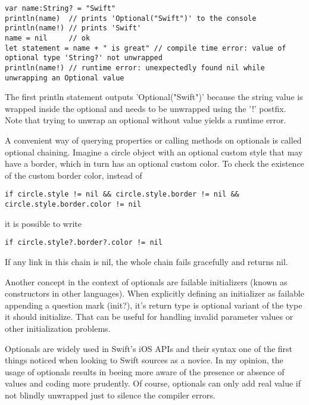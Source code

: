 \begin{lstlisting}[frame=none]
var name:String? = "Swift"
println(name)  // prints 'Optional("Swift")' to the console
println(name!) // prints 'Swift'
name = nil     // ok
let statement = name + " is great" // compile time error: value of optional type 'String?' not unwrapped
println(name!) // runtime error: unexpectedly found nil while unwrapping an Optional value
\end{lstlisting}

The first println statement outputs 'Optional("Swift")' because the string value is wrapped inside the optional and needs to be unwrapped using the '!' postfix. Note that trying to unwrap an optional without value yields a runtime error.

A convenient way of querying properties or calling methods on optionals is called optional chaining. Imagine a circle object with an optional custom style that may have a border, which in turn has an optional custom color. To check the existence of the custom border color, instead of

\begin{lstlisting}[frame=none]
if circle.style != nil && circle.style.border != nil && circle.style.border.color != nil
\end{lstlisting}

it is possible to write

\begin{lstlisting}[frame=none]
if circle.style?.border?.color != nil
\end{lstlisting}

If any link in this chain is nil, the whole chain fails gracefully and returns nil.

Another concept in the context of optionals are failable initializers (known as constructors in other languages). When explicitly defining an initializer as failable appending a question mark (init?), it's return type is optional variant of the type it should initialize. That can be useful for handling invalid parameter values or other initialization problems.

Optionals are widely used in Swift's iOS APIs and their syntax one of the first things noticed when looking to Swift sources as a novice.  
In my opinion, the usage of optionals results in beeing more aware of the presence or absence of values and coding more prudently. Of course, optionals can only add real value if not blindly unwrapped just to silence the compiler errors.  


